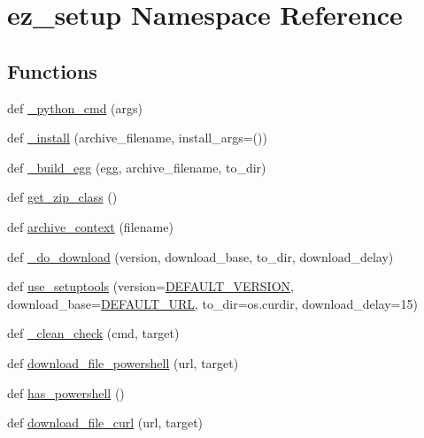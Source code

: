 \hypertarget{namespaceez__setup}{}\section{ez\+\_\+setup Namespace Reference}
\label{namespaceez__setup}
\subsection*{Functions}
\begin{DoxyCompactItemize}
\item 
def \hyperlink{namespaceez__setup_ab8fd3a64bf5c7da757276b05644311a2}{\+\_\+python\+\_\+cmd} (args)
\item 
def \hyperlink{namespaceez__setup_a5a316d95e7476fbc3323740274f5549b}{\+\_\+install} (archive\+\_\+filename, install\+\_\+args=())
\item 
def \hyperlink{namespaceez__setup_a8b92d87596f54a2f039b56e2c20187a8}{\+\_\+build\+\_\+egg} (egg, archive\+\_\+filename, to\+\_\+dir)
\item 
def \hyperlink{namespaceez__setup_a61495793b812c47ba054dd058fa4ba0e}{get\+\_\+zip\+\_\+class} ()
\item 
def \hyperlink{namespaceez__setup_aa735e505d85a6882c1ecc07850dfe0b5}{archive\+\_\+context} (filename)
\item 
def \hyperlink{namespaceez__setup_ac2e3c82312a23add360687d835a87e72}{\+\_\+do\+\_\+download} (version, download\+\_\+base, to\+\_\+dir, download\+\_\+delay)
\item 
def \hyperlink{namespaceez__setup_a2d1c4fef79de3de83e9206d2329caebc}{use\+\_\+setuptools} (version=\hyperlink{namespaceez__setup_aa031ee965f5310beedcd57236385d518}{D\+E\+F\+A\+U\+L\+T\+\_\+\+V\+E\+R\+S\+I\+ON}, download\+\_\+base=\hyperlink{namespaceez__setup_a8096341ad5ff1c048779efc8668fe864}{D\+E\+F\+A\+U\+L\+T\+\_\+\+U\+RL}, to\+\_\+dir=os.\+curdir, download\+\_\+delay=15)
\item 
def \hyperlink{namespaceez__setup_acf457152772437248702139c6f95e99e}{\+\_\+clean\+\_\+check} (cmd, target)
\item 
def \hyperlink{namespaceez__setup_a545d9bb16a7c1509aeb0af7ff5c63a70}{download\+\_\+file\+\_\+powershell} (url, target)
\item 
def \hyperlink{namespaceez__setup_a6ae1e68431f321c135c69001fcca43b5}{has\+\_\+powershell} ()
\item 
def \hyperlink{namespaceez__setup_a5c318033f0bb01ca53fd588c46f7b7ca}{download\+\_\+file\+\_\+curl} (url, target)
\item 

\end{DoxyCompactItemize}
